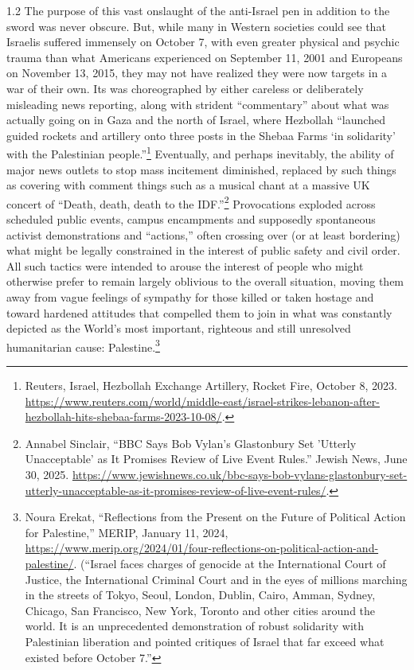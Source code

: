 \documentclass[../unravbook.tex]{subfiles}
\begin{document}
\begin{spacing}{1.2}
The purpose of this vast onslaught of the anti-Israel pen in addition to the sword was never obscure. But, while many in Western societies could see that Israelis suffered immensely on October 7, with even greater physical and psychic trauma than what Americans experienced on September 11, 2001 and Europeans on November 13, 2015, they may not have realized they were now targets in a war of their own. Its was choreographed by either careless or deliberately misleading news reporting, along with strident \enquote{commentary} about what was actually going on in Gaza and the north of Israel, where Hezbollah \enquote{launched guided rockets and artillery onto three posts in the Shebaa Farms `in solidarity' with the Palestinian people.}\footnote{  Reuters, {Israel, Hezbollah Exchange Artillery, Rocket Fire,} October 8, 2023. \url{https://www.reuters.com/world/middle-east/israel-strikes-lebanon-after-hezbollah-hits-shebaa-farms-2023-10-08/}.} Eventually, and perhaps inevitably, the ability of major news outlets to stop mass incitement diminished, replaced by such things as covering with comment things such as a musical chant at a massive UK concert of \enquote{Death, death, death to the IDF.}\footnote{Annabel Sinclair, \enquote{BBC Says Bob Vylan's Glastonbury Set 'Utterly Unacceptable' as It Promises Review of Live Event Rules.} Jewish News, June 30, 2025. \url{https://www.jewishnews.co.uk/bbc-says-bob-vylans-glastonbury-set-utterly-unacceptable-as-it-promises-review-of-live-event-rules/}.} Provocations exploded across scheduled public events, campus encampments and supposedly spontaneous activist demonstrations and \enquote{actions,} often crossing over (or at least bordering) what might be legally constrained in the interest of public safety and civil order. All such tactics were intended to arouse the interest of people who might otherwise prefer to remain largely oblivious to the overall situation, moving them away from vague feelings of sympathy for those killed or taken hostage and toward hardened attitudes that compelled them to join in what was constantly depicted as the World's most important, righteous and still unresolved humanitarian cause: Palestine.\footnote{Noura Erekat, \enquote{Reflections from the Present on the Future of Political Action for Palestine,} MERIP, January 11, 2024, \url{https://www.merip.org/2024/01/four-reflections-on-political-action-and-palestine/}. (\enquote{Israel faces charges of genocide at the International Court of Justice, the International Criminal Court and in the eyes of millions marching in the streets of Tokyo, Seoul, London, Dublin, Cairo, Amman, Sydney, Chicago, San Francisco, New York, Toronto and other cities around the world. It is an unprecedented demonstration of robust solidarity with Palestinian liberation and pointed critiques of Israel that far exceed what existed before October 7.}} 


\end{spacing}
\end{document}
